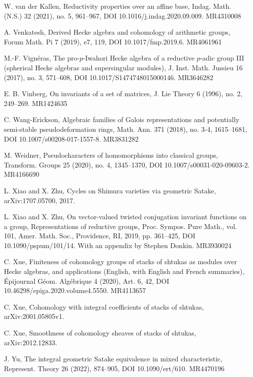 \begin{refs}
\item[{[71]}] W. van der Kallen, Reductivity properties over an affine base, Indag. Math. (N.S.) 32 (2021), no. 5, 961--967, DOI 10.1016/j.indag.2020.09.009. MR4310008
\item[{[72]}] A. Venkatesh, Derived Hecke algebra and cohomology of arithmetic groups, Forum Math. Pi 7 (2019), e7, 119, DOI 10.1017/fmp.2019.6. MR4061961
\item[{[73]}] M.-F. Vign\'eras, The pro-$p$-Iwahori Hecke algebra of a reductive $p$-adic group III (spherical Hecke algebras and supersingular modules), J. Inst. Math. Jussieu 16 (2017), no. 3, 571--608, DOI 10.1017/S1474748015000146. MR3646282
\item[{[74]}] E. B. Vinberg, On invariants of a set of matrices, J. Lie Theory 6 (1996), no. 2, 249--269. MR1424635
\item[{[75]}] C. Wang-Erickson, Algebraic families of Galois representations and potentially semi-stable pseudodeformation rings, Math. Ann. 371 (2018), no. 3-4, 1615--1681, DOI 10.1007/s00208-017-1557-8. MR3831282
\item[{[76]}] M. Weidner, Pseudocharacters of homomorphisms into classical groups, Transform. Groups 25 (2020), no. 4, 1345--1370, DOI 10.1007/s00031-020-09603-2. MR4166690
\item[{[77]}] L. Xiao and X. Zhu, Cycles on Shimura varieties via geometric Satake, arXiv:1707.05700, 2017.
\item[{[78]}] L. Xiao and X. Zhu, On vector-valued twisted conjugation invariant functions on a group, Representations of reductive groups, Proc. Sympos. Pure Math., vol. 101, Amer. Math. Soc., Providence, RI, 2019, pp. 361--425, DOI 10.1090/pspum/101/14. With an appendix by Stephen Donkin. MR3930024
\item[{[79]}] C. Xue, Finiteness of cohomology groups of stacks of shtukas as modules over Hecke algebras, and applications (English, with English and French summaries), \'Epijournal G\'eom. Alg\'ebrique 4 (2020), Art. 6, 42, DOI 10.46298/epiga.2020.volume4.5550. MR4113657
\item[{[80]}] C. Xue, Cohomology with integral coefficients of stacks of shtukas, arXiv:2001.05805v1.
\item[{[81]}] C. Xue, Smoothness of cohomology sheaves of stacks of shtukas, arXiv:2012.12833.
\item[{[82]}] J. Yu, The integral geometric Satake equivalence in mixed characteristic, Represent. Theory 26 (2022), 874--905, DOI 10.1090/ert/610. MR4470196

\end{refs}

